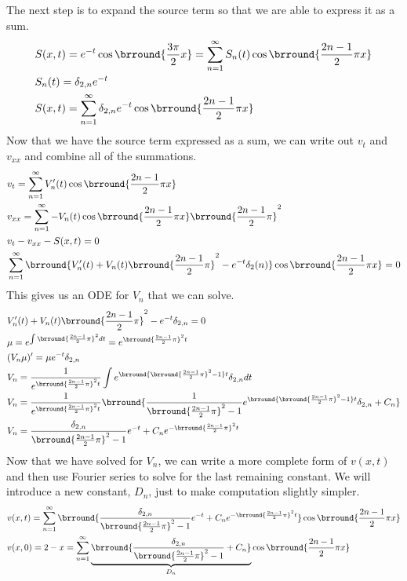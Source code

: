 The next step is to expand the source term so that we are able to express it as a sum.
\begin{align*}
    &S(x,t)=e^{-t}\cos\brround{\frac{3\pi}{2}x}=\sum_{n=1}^\infty S_n(t)\cos\brround{\frac{2n-1}{2}\pi x}\\
    &S_n(t)=\delta_{2,n}e^{-t}\\
    &S(x,t)=\sum_{n=1}^\infty \delta_{2,n}e^{-t}\cos\brround{\frac{2n-1}{2}\pi x}
\end{align*}
Now that we have the source term expressed as a sum, we can write out $v_t$ and $v_{xx}$ and combine all of the summations.
\begin{align*}
    &v_t=\sum_{n=1}^\infty V_n'(t)\cos\brround{\frac{2n-1}{2}\pi x}\\
    &v_{xx}=\sum_{n=1}^\infty -V_n(t)\cos\brround{\frac{2n-1}{2}\pi x}\brround{\frac{2n-1}{2}\pi}^2\\
    &v_t-v_{xx}-S(x,t)=0\\
    &\sum_{n=1}^\infty\brround{V_n'(t)+V_n(t)\brround{\frac{2n-1}{2}\pi}^2-e^{-t}\delta_2(n)}\cos\brround{\frac{2n-1}{2}\pi x}=0
\end{align*}
This gives us an ODE for $V_n$ that we can solve.
\begin{align*}
    &V_n'(t)+V_n(t)\brround{\frac{2n-1}{2}\pi}^2-e^{-t}\delta_{2,n}=0\\
    &\mu=e^{\int \brround{\frac{2n-1}{2}\pi}^2dt}=e^{\brround{\frac{2n-1}{2}\pi}^2 t}\\
    &(V_n\mu)'=\mu e^{-t}\delta_{2,n}\\
    &V_n=\frac{1}{e^{\brround{\frac{2n-1}{2}\pi}^2 t}}\int e^{\brround{\brround{\frac{2n-1}{2}\pi}^2-1}t}\delta_{2,n}dt\\
    &V_n=\frac{1}{e^{\brround{\frac{2n-1}{2}\pi}^2 t}}\brround{\frac{1}{\brround{\frac{2n-1}{2}\pi}^2-1}e^{\brround{\brround{\frac{2n-1}{2}\pi}^2-1}t}\delta_{2,n}+C_n}\\
    &V_n=\frac{\delta_{2,n}}{\brround{\frac{2n-1}{2}\pi}^2-1}e^{-t}+C_ne^{-\brround{\frac{2n-1}{2}\pi}^2t}
\end{align*}
Now that we have solved for $V_n$, we can write a more complete form of $v(x,t)$ and then use Fourier series to solve for the last remaining constant. We will introduce a new constant, $D_n$, just to make computation slightly simpler.
\begin{align*}
    &v(x,t)=\sum_{n=1}^\infty\brround{\frac{\delta_{2,n}}{\brround{\frac{2n-1}{2}\pi}^2-1}e^{-t}+C_ne^{-\brround{\frac{2n-1}{2}\pi}^2t}}\cos\brround{\frac{2n-1}{2}\pi x}\\
    &v(x,0)=2-x=\sum_{n=1}^\infty\underbrace{\brround{\frac{\delta_{2,n}}{\brround{\frac{2n-1}{2}\pi}^2-1}+C_n}}_{D_n}\cos\brround{\frac{2n-1}{2}\pi x}
\end{align*}
